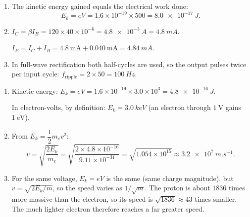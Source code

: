\documentclass[11pt]{article}
\begin{document}
\begin{corrige}
\begin{enumerate}
\item The kinetic energy gained equals the electrical work done:
\[ E_k = eV = 1.6\times 10^{-19} \times 500 = \SI{8.0e-17}{J}. \]
\item $I_C = \beta I_B = 120 \times 40\times 10^{-6} = \SI{4.8e-3}{A} = \SI{4.8}{mA}$.

$I_E = I_C + I_B = 4.8\ \mathrm{mA} + 0.040\ \mathrm{mA} = \SI{4.84}{mA}$.
\item In full-wave rectification both half-cycles are used, so the output pulses twice per input cycle: $f_{\text{ripple}} = 2 \times 50 = \SI{100}{Hz}$.
\end{enumerate}
\end{corrige}

\begin{corrige}
\begin{enumerate}
\item Kinetic energy: $E_k = eV = 1.6\times 10^{-19} \times 3.0\times 10^{3} = \SI{4.8e-16}{J}$.

In electron-volts, by definition: $E_k = \SI{3.0}{keV}$ (an electron through $1\ \mathrm{V}$ gains $1\ \mathrm{eV}$).
\item From $E_k = \dfrac{1}{2}m_e v^2$:
\[ v = \sqrt{\frac{2E_k}{m_e}} = \sqrt{\frac{2 \times 4.8\times 10^{-16}}{9.11\times 10^{-31}}} = \sqrt{1.054\times 10^{15}} \approx \SI{3.2e7}{m.s^{-1}}. \]
\item For the same voltage, $E_k = eV$ is the same (same charge magnitude), but $v = \sqrt{2E_k/m}$, so the speed varies as $1/\sqrt{m}$. The proton is about $1836$ times more massive than the electron, so its speed is $\sqrt{1836} \approx 43$ times smaller. The much lighter electron therefore reaches a far greater speed.
\end{enumerate}
\end{corrige}
\end{document}
